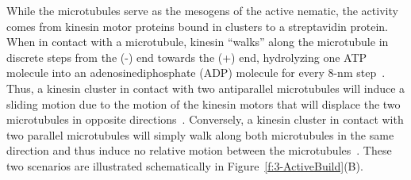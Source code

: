 While the microtubules serve as the mesogens of the active nematic, the activity comes from kinesin motor proteins bound in clusters to a streptavidin protein.
When in contact with a microtubule, kinesin ``walks'' along the microtubule in discrete steps from the (-) end towards the (+) end, hydrolyzing one ATP molecule into an adenosinediphosphate (ADP) molecule for every 8-nm step~\cite{RN250}.
Thus, a kinesin cluster in contact with two antiparallel microtubules will induce a sliding motion due to the motion of the kinesin motors that will displace the two microtubules in opposite directions~\cite{RN4,RN3}.
Conversely, a kinesin cluster in contact with two parallel microtubules will simply walk along both microtubules in the same direction and thus induce no relative motion between the microtubules~\cite{RN4,RN3}.
These two scenarios are illustrated schematically in Figure~\ref{f:3-ActiveBuild}(B).
